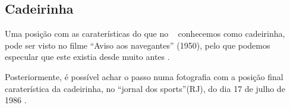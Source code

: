 \subsection{Cadeirinha}

\caracterpostura{\CheckedItem}{\NoCheckedItem}
Uma posição com as caraterísticas do que no \AnoLivro~ conhecemos como cadeirinha, 
pode ser visto no filme ``Aviso aos navegantes'' (1950),
pelo que podemos especular que este existia desde muito antes \cite[min. 40:35]{AtlantidaDance}.

Posteriormente, é possível achar o passo numa fotografia com a posição final caraterística da cadeirinha, 
no ``jornal dos sports''(RJ),
do dia 17 de julho de 1986 \cite[pp. 6]{gafieiraaredeout2}. 
